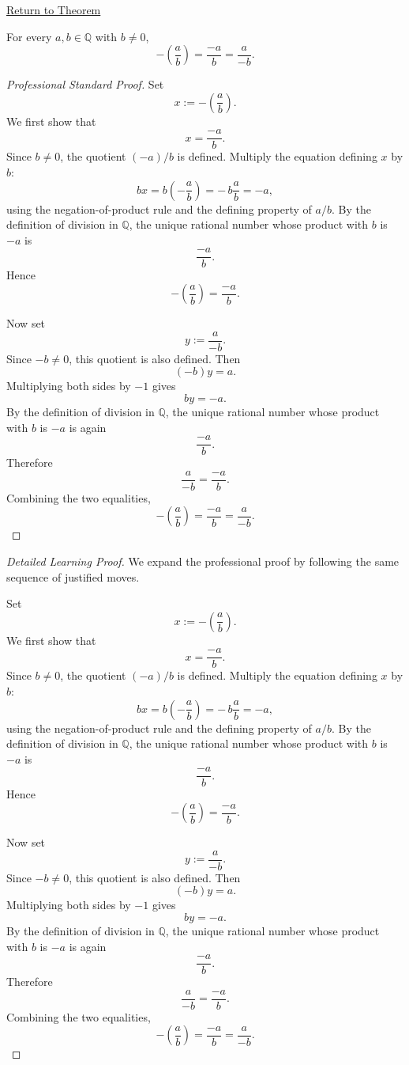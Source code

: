 \newpage
{}
\label{prf:rational-fraction-negation}

\begin{remark*}[Return]
\hyperref[thm:rational-fraction-negation]{Return to Theorem}
\end{remark*}

\begin{theorem*}
For every $a,b\in\mathbb{Q}$ with $b\neq 0$,
\[
-\left(\frac{a}{b}\right)
=
\frac{-a}{b}
=
\frac{a}{-b}.
\]
\end{theorem*}

\begin{proof}[Professional Standard Proof]
\LRAProofBodyStart
Set
\[
x:=-\left(\frac{a}{b}\right).
\]
We first show that
\[
x=\frac{-a}{b}.
\]
Since $b\neq 0$, the quotient $(-a)/b$ is defined.  Multiply the equation
defining $x$ by $b$:
\[
bx=b\left(-\frac{a}{b}\right)=-\,b\frac{a}{b}=-a,
\]
using the negation-of-product rule and the defining property of
$a/b$.  By the definition of division in $\mathbb{Q}$, the unique rational
number whose product with $b$ is $-a$ is
\[
\frac{-a}{b}.
\]
Hence
\[
-\left(\frac{a}{b}\right)=\frac{-a}{b}.
\]

Now set
\[
y:=\frac{a}{-b}.
\]
Since $-b\neq 0$, this quotient is also defined.  Then
\[
(-b)y=a.
\]
Multiplying both sides by $-1$ gives
\[
by=-a.
\]
By the definition of division in $\mathbb{Q}$, the unique rational number
whose product with $b$ is $-a$ is again
\[
\frac{-a}{b}.
\]
Therefore
\[
\frac{a}{-b}=\frac{-a}{b}.
\]
Combining the two equalities,
\[
-\left(\frac{a}{b}\right)=\frac{-a}{b}=\frac{a}{-b}.
\]
\end{proof}

\begin{proof}[Detailed Learning Proof]
\LRAProofBodyStart
We expand the professional proof by following the same sequence of justified moves.

Set
\[
x:=-\left(\frac{a}{b}\right).
\]
We first show that
\[
x=\frac{-a}{b}.
\]
Since $b\neq 0$, the quotient $(-a)/b$ is defined.  Multiply the equation
defining $x$ by $b$:
\[
bx=b\left(-\frac{a}{b}\right)=-\,b\frac{a}{b}=-a,
\]
using the negation-of-product rule and the defining property of
$a/b$.  By the definition of division in $\mathbb{Q}$, the unique rational
number whose product with $b$ is $-a$ is
\[
\frac{-a}{b}.
\]
Hence
\[
-\left(\frac{a}{b}\right)=\frac{-a}{b}.
\]

Now set
\[
y:=\frac{a}{-b}.
\]
Since $-b\neq 0$, this quotient is also defined.  Then
\[
(-b)y=a.
\]
Multiplying both sides by $-1$ gives
\[
by=-a.
\]
By the definition of division in $\mathbb{Q}$, the unique rational number
whose product with $b$ is $-a$ is again
\[
\frac{-a}{b}.
\]
Therefore
\[
\frac{a}{-b}=\frac{-a}{b}.
\]
Combining the two equalities,
\[
-\left(\frac{a}{b}\right)=\frac{-a}{b}=\frac{a}{-b}.
\]
\end{proof}

